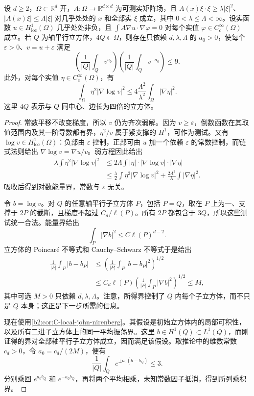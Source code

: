 \begin{proposition}[对数能量与正负平均连接]
\label{b2:prop:H2-log-bridge}
设 \(d\geq2\)，\(\Omega\subset\mathbb R^d\) 开，\(A:\Omega\to\mathbb R^{d\times d}\) 为可测实矩阵场，且
\(A(x)\xi\cdot\xi\geq\lambda|\xi|^2\)、\(|A(x)\xi|\leq\Lambda|\xi|\) 对几乎处处的 \(x\) 和全部实 \(\xi\) 成立，其中 \(0<\lambda\leq\Lambda<\infty\)。设实函数 \(u\in H^1_{\mathrm{loc}}(\Omega)\) 几乎处处非负，且
\(\int A\nabla u\cdot\nabla\varphi=0\) 对每个实值 \(\varphi\in C_c^\infty(\Omega)\) 成立。若 \(Q\) 为轴平行立方体，\(4Q\Subset\Omega\)，则存在只依赖 \(d,\lambda,\Lambda\) 的 \(a_0>0\)，使每个 \(\varepsilon>0\)、\(v=u+\varepsilon\) 满足
\[
 \left(\frac1{|Q|}\int_Qv^{a_0}\right)
 \left(\frac1{|Q|}\int_Qv^{-a_0}\right)\leq9.
\]
此外，对每个实值 \(\eta\in C_c^\infty(\Omega)\)，有
\[
 \int_\Omega\eta^2|\nabla\log v|^2
 \leq4\frac{\Lambda^2}{\lambda^2}
                  \int_\Omega|\nabla\eta|^2.
\]
这里 \(4Q\) 表示与 \(Q\) 同中心、边长为四倍的立方体。
\end{proposition}
\begin{proof}
常数平移不改变梯度，所以 \(v\) 仍为齐次弱解。因为 \(v\geq\varepsilon\)，倒数函数在其取值范围内及其一阶导数都有界，\(\eta^2/v\) 属于紧支撑的 \(H^1\)，可作为测试。又有 \(\log v\in H^1_{\mathrm{loc}}(\Omega)\)：负部由 \(\varepsilon\) 控制，正部可由 \(u\) 加一个依赖 \(\varepsilon\) 的常数控制，而链式法则给出 \(\nabla\log v=\nabla u/v\)。弱方程因此给出
\[
 \begin{aligned}
 \lambda\int\eta^2|\nabla\log v|^2
 &\leq2\Lambda\int|\eta|\cdot|\nabla\log v|
                                  \cdot|\nabla\eta|\\
 &\leq\frac\lambda2\int\eta^2|\nabla\log v|^2
                  +\frac{2\Lambda^2}{\lambda}
                             \int|\nabla\eta|^2.
 \end{aligned}
\]
吸收后得到对数能量界，常数与 \(\varepsilon\) 无关。

令 \(b=\log v\)。对 \(Q\) 的任意轴平行子立方体 \(P\)，包括 \(P=Q\)，取在 \(P\) 上为一、支撑于 \(2P\) 的截断，且梯度不超过 \(C_d/\ell(P)\)。所有 \(2P\) 都包含于 \(3Q\)，所以这些测试统一合法。能量界给出
\[
 \int_P|\nabla b|^2\leq C\ell(P)^{d-2}.
\]
立方体的 Poincaré 不等式和 Cauchy--Schwarz 不等式于是给出
\[
 \begin{aligned}
 \frac1{|P|}\int_P|b-b_P|
 &\leq\left(\frac1{|P|}\int_P|b-b_P|^2\right)^{1/2}\\
 &\leq C_d\ell(P)
          \left(\frac1{|P|}\int_P|\nabla b|^2\right)^{1/2}
 \leq M,
 \end{aligned}
\]
其中可选 \(M>0\) 只依赖 \(d,\lambda,\Lambda\)。注意，所得界控制了 \(Q\) 内每个子立方体，而不只是 \(Q\) 本身；这正是下一步所需的信息。

现在使用\cref{b2:cor:C-local-john-nirenberg}。其假设是初始立方体内的局部可积性，以及所有二进子立方体上的同一平均振荡界。这里 \(b\in H^1(Q)\subset L^1(Q)\)，而刚证得的界对全部轴平行子立方体成立，因而满足该假设。取推论中的维数常数 \(c_d>0\)，令
\(a_0=c_d/(2M)\)，便有
\[
 \frac1{|Q|}\int_Qe^{\pm a_0(b-b_Q)}\leq3.
\]
分别乘回 \(e^{a_0b_Q}\) 和 \(e^{-a_0b_Q}\)，再将两个平均相乘，未知常数因子抵消，得到所列乘积界。
\end{proof}

